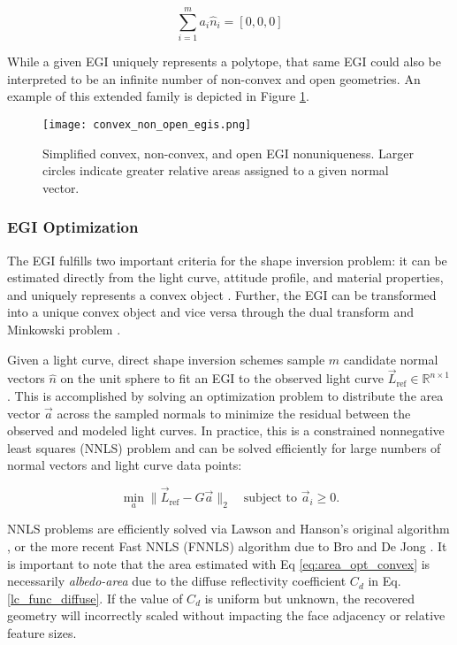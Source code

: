\begin{equation} \label{eq:egi_closure}
  \sum_{i=1}^m a_i \hat{n}_i = [0, 0, 0]
\end{equation}

While a given EGI uniquely represents a polytope, that same EGI could also be interpreted to be an infinite number of non-convex and open geometries. An example of this extended family is depicted in Figure \ref{fig:egi_family}.

\begin{figure}[!htb]
  \centering
  \texttt{[image: convex\_non\_open\_egis.png]}
  \caption{Simplified convex, non-convex, and open EGI nonuniqueness. Larger circles indicate greater relative areas assigned to a given normal vector.}
  \label{fig:egi_family}
\end{figure}

\subsubsection{EGI Optimization}

The EGI fulfills two important criteria for the shape inversion problem: it can be estimated directly from the light curve, attitude profile, and material properties, and uniquely represents a convex object \cite{kaasalainen2001}. Further, the EGI can be transformed into a unique convex object and vice versa through the dual transform and Minkowski problem \cite{little1985, minkowski1909}. 

Given a light curve, direct shape inversion schemes sample $m$ candidate normal vectors $\hat{n}$ on the unit sphere to fit an EGI to the observed light curve $\vec{L}_\textrm{ref} \in \mathbb{R}^{n \times 1}$ \cite{friedman2020, fan2020thesis}. This is accomplished by solving an optimization problem to distribute the area vector $\vec{a}$ across the sampled normals to minimize the residual between the observed and modeled light curves. In practice, this is a constrained nonnegative least squares (NNLS) problem and can be solved efficiently for large numbers of normal vectors and light curve data points:

\begin{equation} \label{eq:area_opt_convex}
  \min_{a}{\|\vec{L}_{\textrm{ref}} - G \vec{a}\|_2} \:\:\: \textrm{ subject to } \vec{a}_i \geq 0.
\end{equation}

NNLS problems are efficiently solved via Lawson and Hanson's original algorithm \cite{lawson1976}, or the more recent Fast NNLS (FNNLS) algorithm due to Bro and De Jong \cite{bro1996}. It is important to note that the area estimated with Eq \ref{eq:area_opt_convex} is necessarily \textit{albedo-area} due to the diffuse reflectivity coefficient $C_d$ in Eq. \ref{lc_func_diffuse}. If the value of $C_d$ is uniform but unknown, the recovered geometry will incorrectly scaled without impacting the face adjacency or relative feature sizes.

